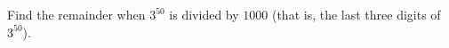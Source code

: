 Find the remainder when $3^{50}$ is divided by $1000$ (that is, the last three digits of $3^{50}$).

